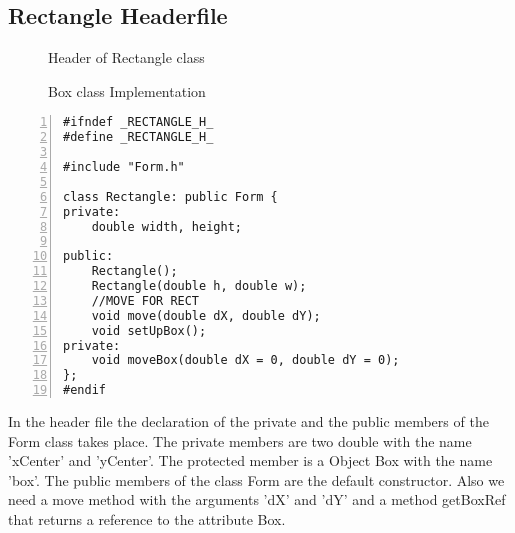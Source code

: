 \documentclass{article}
\begin{document}
\subsection{Rectangle Headerfile}
\begin{figure}
\scriptsize{\caption{Header of Rectangle class}}
\scriptsize{\caption{Box class Implementation}}
\end{figure}
\begin{lstlisting}[basicstyle=\footnotesize\ttfamily, numbers=left, stepnumber=1, numberstyle = \normalsize]
#ifndef _RECTANGLE_H_
#define _RECTANGLE_H_

#include "Form.h"

class Rectangle: public Form {
private:
	double width, height; 

public:
	Rectangle();
	Rectangle(double h, double w);
	//MOVE FOR RECT
	void move(double dX, double dY);
	void setUpBox();
private:
	void moveBox(double dX = 0, double dY = 0);	
};
#endif
\end{lstlisting}
\normalsize{In the header file the declaration of the private and the public members of the Form class takes place.\newline
The private members are two double with the name 'xCenter' and 'yCenter'.
The protected member is a Object Box with the name 'box'.
The public members of the class Form are the default constructor.\newline 
Also we need a move method with the arguments 'dX' and 'dY' and a method getBoxRef that returns a reference to the attribute Box.\newline
}\newpage
\end{document}
